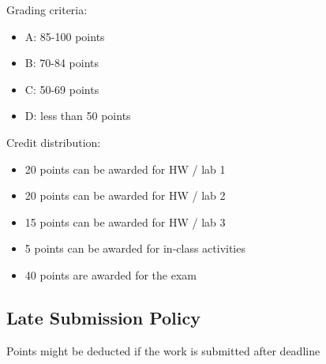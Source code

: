 Grading criteria:
\begin{itemize}
    \item A: 85-100 points
    \item B: 70-84 points
    \item C: 50-69 points
    \item D: less than 50 points
\end{itemize}

Credit distribution:
\begin{itemize}
    \item 20 points can be awarded for HW / lab 1
    \item 20 points can be awarded for HW / lab 2
    \item 15 points can be awarded for HW / lab 3
    \item 5 points can be awarded for in-class activities
    \item 40 points are awarded for the exam
\end{itemize}

\subsection{Late Submission Policy}
Points might be deducted if the work is submitted after deadline
